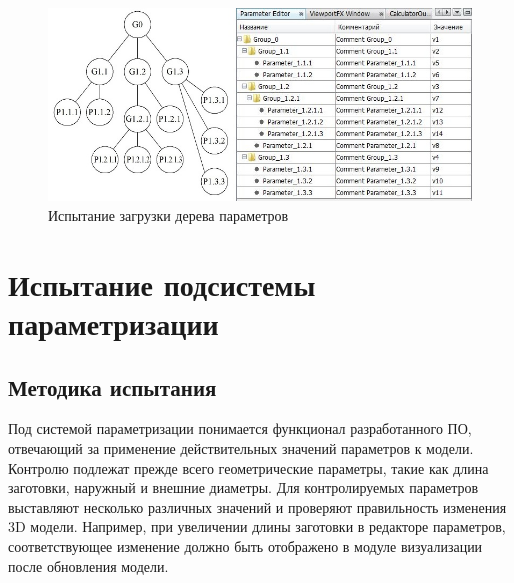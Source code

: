 \documentclass[14pt,oneside,final]{extreport}
\begin{document}
	\begin{figure}[!h]
		\begin{center}
			\includegraphics[width=\textwidth]{img/loader-tree-test} 
		\end{center}
		\caption{Испытание загрузки дерева параметров}
		\label{fig:loader-tree-test}
	\end{figure}
	
	\section{Испытание подсистемы параметризации}
	\subsection{Методика испытания}
	Под системой параметризации понимается функционал разработанного ПО, отвечающий за применение действительных значений параметров к модели. Контролю подлежат прежде всего геометрические параметры, такие как длина заготовки, наружный и внешние диаметры. Для контролируемых параметров выставляют несколько различных значений и проверяют правильность изменения 3D модели. Например, при увеличении длины заготовки в редакторе параметров, соответствующее изменение должно быть отображено в модуле визуализации после обновления модели. 
	
\end{document}
